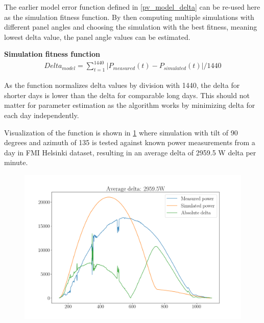 The earlier model error function defined in \ref{pv_model_delta} can be re-used here as the simulation fitness function. By then computing multiple simulations with different panel angles and choosing the simulation with the best fitness, meaning lowest delta value, the panel angle values can be estimated.

\vspace{6mm}
\noindent\textbf{Simulation fitness function}
\begin{equation}
\begin{split}
\label{pv_model_delta_v2}
Delta_{model} = \sum_{t=1}^{1440} |P_{measured}(t) - P_{simulated}(t)| /1440
\end{split}
\end{equation}

\noindent As the function normalizes delta values by division with 1440, the delta for shorter days is lower than the delta for comparable long days. This should not matter for parameter estimation as the algorithm works by minimizing delta for each day independently. 

Visualization of the function is shown in \ref{fig_simulation_fitness} where simulation with tilt of 90 degrees and azimuth of 135 is tested against known power measurements from a day in FMI Helsinki dataset, resulting in an average delta of 2959.5 W delta per minute.



\begin{figure}[h]
\centering
\includegraphics[width=0.85\linewidth]{pics/measured_vs_simulated} %
\label{fig_simulation_fitness}
\end{figure}




\newpage
